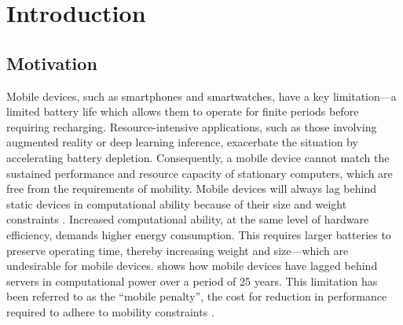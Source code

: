 \chapter{Introduction}
\section{Motivation}
\label{sec:motivation}
Mobile devices, such as smartphones and smartwatches, have a key limitation---a
limited battery life which allows them to operate for finite periods before
requiring recharging.  Resource-intensive applications, such as those involving
augmented reality or deep learning inference, exacerbate the situation by
accelerating battery depletion.  Consequently, a mobile device cannot match the
sustained performance and resource capacity of stationary computers, which are
free from the requirements of mobility. Mobile devices will always lag behind
static devices in computational ability because of their size and weight
constraints \cite{satya2014}. Increased computational ability, at the same
level of hardware efficiency, demands higher energy consumption. This requires
larger batteries to preserve operating time, thereby increasing weight and
size---which are undesirable for mobile devices.
 shows how mobile devices have lagged behind
servers in computational power over a period of 25 years. This limitation has
been referred to as the ``mobile penalty'', the cost for reduction in
performance required to adhere to mobility constraints
\cite{satya-edge-native}.

